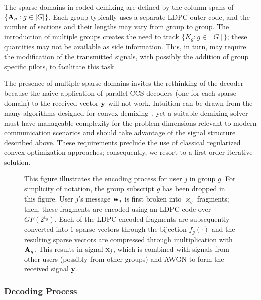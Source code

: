 \documentclass[journal]{IEEEtran}
\begin{document}
\begin{remark}
\label{remark:cvxoptcomplexity}
The sparse domains in coded demixing are defined by the column spans of $\{\mathbf{A}_g : g\in[G]\}$.
Each group typically uses a separate LDPC outer code, and the number of sections and their lengths may vary from group to group.
The introduction of multiple groups creates the need to track $\{ K_g : g \in [G] \}$; these quantities may not be available as side information.
This, in turn, may require the modification of the transmitted signals, with possibly the addition of group specific pilots, to facilitate this task.
\end{remark}

\begin{remark}
The presence of multiple sparse domains invites the rethinking of the decoder because the naive application of parallel CCS decoders (one for each sparse domain) to the received vector $\mathbf{y}$ will not work.
Intuition can be drawn from the many algorithms designed for convex demixing~\cite{mccoy2014convexity, mccoy2014sharp, amelunxen2014living, Chandrasekaran_2012, hedge2012signal, bhaskar2013atomic}, yet a suitable demixing solver must have manageable complexity for the problem dimensions relevant to modern communication scenarios and should take advantage of the signal structure described above.
These requirements preclude the use of classical regularized convex optimization approaches; consequently, we resort to a first-order iterative solution. 
\end{remark}

\begin{figure}
\centering

\caption{
    This figure illustrates the encoding process for user $j$ in group $g$. 
    For simplicity of notation, the group subscript $g$ has been dropped in this figure. 
    User $j$'s message $\mathbf{w}_j$ is first broken into $\varkappa_g$ fragments; then, these fragments are encoded using an LDPC code over $GF\left(2^{v_g}\right)$. 
    Each of the LDPC-encoded fragments are subsequently converted into $1$-sparse vectors through the bijection $f_g\left(\cdot\right)$ and the resulting sparse vectors are compressed through multiplication with $\mathbf{A}_g$.
    This results in signal $\mathbf{x}_j$, which is combined with signals from other users (possibly from other groups) and AWGN to form the received signal $\mathbf{y}$.
}
\label{figure:EncodingProcess}
\end{figure}


\subsubsection{Decoding Process}
\end{document}
